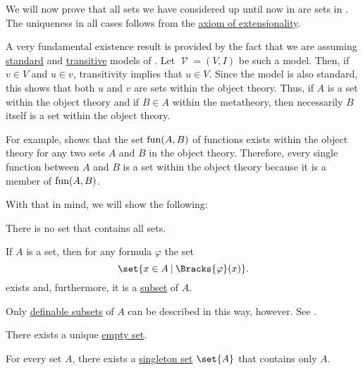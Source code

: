 \begin{proposition}\label{thm:zfc_existence_theorems}
  We will now prove that all sets we have considered up until now in  are sets in \hyperref[def:zfc]{}. The uniqueness in all cases follows from the \hyperref[def:zfc/extensionality]{axiom of extensionality}.

  A very fundamental existence result is provided by the fact that we are assuming \hyperref[rem:standard_model_of_set_theory]{standard} and \hyperref[rem:transitive_model_of_set_theory]{transitive} models of . Let \( \mscrV = (V, I) \) be such a model. Then, if \( v \in V \) and \( u \in v \), transitivity implies that \( u \in V \). Since the model is also standard, this shows that both \( u \) and \( v \) are sets within the object theory. Thus, if \( A \) is a set within the object theory and if \( B \in A \) within the metatheory, then necessarily \( B \) itself is a set within the object theory.

  For example,  shows that the set \( \operatorname{fun}(A, B) \) of functions exists within the object theory for any two sets \( A \) and \( B \) in the object theory. Therefore, every single function between \( A \) and \( B \) is a set within the object theory because it is a member of \( \operatorname{fun}(A, B) \).

  With that in mind, we will show the following:

  \begin{thmenum}
     There is no set that contains all sets.

     If \( A \) is a set, then for any formula \( \varphi \) the set
    \begin{equation*}
      \set{ x \in A \given \Bracks{\varphi}(x) }.
    \end{equation*}
    exists and, furthermore, it is a \hyperref[def:subset]{subset} of \( A \).

    Only \hyperref[def:first_order_definability]{definable subsets} of \( A \) can be described in this way, however. See .

     There exists a unique \hyperref[def:empty_set]{empty set}.

     For every set \( A \), there exists a \hyperref[def:subsingleton_set]{singleton set} \( \set{ A } \) that contains only \( A \).


\end{thmenum}
\end{proposition}

